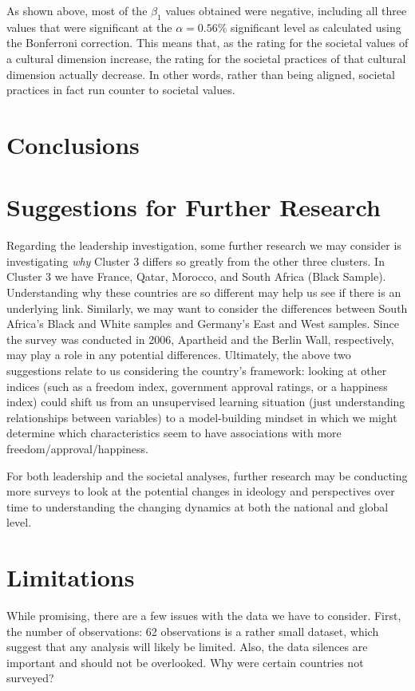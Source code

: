 \documentclass[
]{article}
\begin{document}
As shown above, most of the \(\beta_1\) values obtained were negative,
including all three values that were significant at the
\(\alpha = 0.56\)\% significant level as calculated using the Bonferroni
correction. This means that, as the rating for the societal values of a
cultural dimension increase, the rating for the societal practices of
that cultural dimension actually decrease. In other words, rather than
being aligned, societal practices in fact run counter to societal
values.

\hypertarget{conclusions}{%
\section{Conclusions}\label{conclusions}}

\hypertarget{suggestions-for-further-research}{%
\section{Suggestions for Further
Research}\label{suggestions-for-further-research}}

Regarding the leadership investigation, some further research we may
consider is investigating \emph{why} Cluster 3 differs so greatly from
the other three clusters. In Cluster 3 we have France, Qatar, Morocco,
and South Africa (Black Sample). Understanding why these countries are
so different may help us see if there is an underlying link. Similarly,
we may want to consider the differences between South Africa's Black and
White samples and Germany's East and West samples. Since the survey was
conducted in 2006, Apartheid and the Berlin Wall, respectively, may play
a role in any potential differences. Ultimately, the above two
suggestions relate to us considering the country's framework: looking at
other indices (such as a freedom index, government approval ratings, or
a happiness index) could shift us from an unsupervised learning
situation (just understanding relationships between variables) to a
model-building mindset in which we might determine which characteristics
seem to have associations with more freedom/approval/happiness.

For both leadership and the societal analyses, further research may be
conducting more surveys to look at the potential changes in ideology and
perspectives over time to understanding the changing dynamics at both
the national and global level.

\hypertarget{limitations}{%
\section{Limitations}\label{limitations}}

While promising, there are a few issues with the data we have to
consider. First, the number of observations: 62 observations is a rather
small dataset, which suggest that any analysis will likely be limited.
Also, the data silences are important and should not be overlooked. Why
were certain countries not surveyed?
\end{document}
